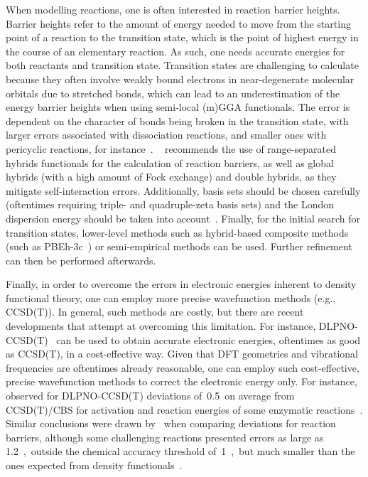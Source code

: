 When modelling reactions,
one is often interested in reaction barrier heights.
Barrier heights refer to the amount of energy needed to move from the starting point of a reaction to the transition state,
which is the point of highest energy in the course of an elementary reaction.
As such,
one needs accurate energies for both reactants and transition state.
Transition states are challenging to calculate because they often involve weakly bound electrons
in near-degenerate molecular orbitals
due to stretched bonds,
which can lead to an underestimation of the energy barrier heights when using semi-local (m)GGA functionals.
The error is dependent on the character of bonds being broken in the transition state,
with larger errors associated with dissociation reactions,
and smaller ones with pericyclic reactions,
for instance~\cite{Bursch_2022}.
\citeauthor{Bursch_2022}~\cite{Bursch_2022} recommends the use of range-separated hybrids functionals for the calculation of reaction barriers,
as well as global hybrids (with a high amount of Fock exchange) and double hybrids,
as they mitigate self-interaction errors.
Additionally,
basis sets should be chosen carefully (oftentimes requiring triple-
and quadruple-zeta basis sets) and the London dispersion energy should be taken into account~\cite{Bursch_2022}.
Finally,
for the initial search for transition states,
lower-level methods such as hybrid-based composite methods (such as PBEh-3c~\cite{Grimme_2015}) or semi-empirical methods can be used.
Further refinement can then be performed afterwards.

Finally,
in order to overcome the errors in electronic energies inherent to density functional theory,
one can employ more precise wavefunction methods (e.g.,
CCSD(T)).
In general,
such methods are costly,
but there are recent developments that attempt at overcoming this limitation.
For instance,
DLPNO-CCSD(T)~\cite{Riplinger_2013,Riplinger_2016}
can be used to obtain accurate electronic energies,
oftentimes
as good as CCSD(T),
in a cost-effective way.
Given that DFT geometries and vibrational frequencies are oftentimes already reasonable,
one can employ such cost-effective,
precise wavefunction methods to correct the electronic energy only.
For instance,~\cite{Paiva_2020} observed for DLPNO-CCSD(T)
deviations of~0.5~\kcalmol on average from CCSD(T)/CBS for
activation and reaction energies of some enzymatic reactions~\cite{Paiva_2020}.
Similar conclusions were drawn by~\cite{Sandler_2021}
when comparing deviations for reaction barriers,
although
some challenging reactions presented errors as large as 1.2~\kcalmol,~outside the chemical accuracy threshold of~1~\kcalmol,~but
much smaller than the ones expected from density functionals~\cite{Sandler_2021}.

